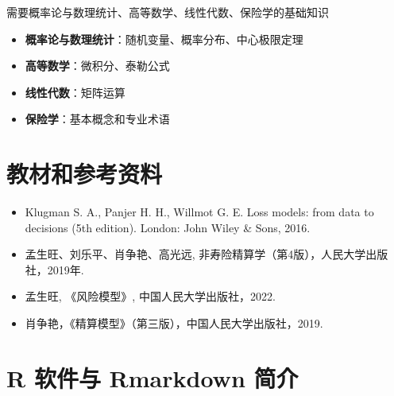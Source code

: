 \documentclass[
]{book}
\providecommand{\tightlist}{%
  \setlength{\itemsep}{0pt}\setlength{\parskip}{0pt}}
\begin{document}
需要概率论与数理统计、高等数学、线性代数、保险学的基础知识

\begin{itemize}
\tightlist
\item
  \textbf{概率论与数理统计}：随机变量、概率分布、中心极限定理
\item
  \textbf{高等数学}：微积分、泰勒公式
\item
  \textbf{线性代数}：矩阵运算
\item
  \textbf{保险学}：基本概念和专业术语
\end{itemize}

\hypertarget{ux6559ux6750ux548cux53c2ux8003ux8d44ux6599}{%
\section{教材和参考资料}\label{ux6559ux6750ux548cux53c2ux8003ux8d44ux6599}}

\begin{itemize}
\item
  Klugman S. A., Panjer H. H., Willmot G. E. Loss models: from data to decisions (5th edition). London: John Wiley \& Sons, 2016.
\item
  孟生旺、刘乐平、肖争艳、高光远, 非寿险精算学（第4版），人民大学出版社，2019年.
\item
  孟生旺, 《风险模型》, 中国人民大学出版社，2022.
\item
  肖争艳，《精算模型》（第三版），中国人民大学出版社，2019.
\end{itemize}

\hypertarget{r-ux8f6fux4ef6ux4e0e-rmarkdown-ux7b80ux4ecb}{%
\section{R 软件与 Rmarkdown 简介}\label{r-ux8f6fux4ef6ux4e0e-rmarkdown-ux7b80ux4ecb}}
\end{document}
